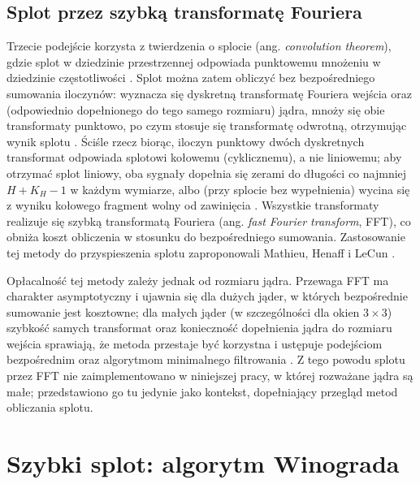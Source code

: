 \documentclass[a4paper,12pt]{book} %
\begin{document}
\subsection{Splot przez szybką transformatę Fouriera}
\label{sec:splot-fft}

Trzecie podejście korzysta z twierdzenia o splocie (ang. \emph{convolution theorem}), gdzie splot w dziedzinie przestrzennej odpowiada punktowemu mnożeniu w dziedzinie częstotliwości \cite{oppenheim2010dtsp}. Splot można zatem obliczyć bez bezpośredniego sumowania iloczynów: wyznacza się dyskretną transformatę Fouriera wejścia oraz (odpowiednio dopełnionego do tego samego rozmiaru) jądra, mnoży się obie transformaty punktowo, po czym stosuje się transformatę odwrotną, otrzymując wynik splotu \cite{oppenheim2010dtsp}. Ściśle rzecz biorąc, iloczyn punktowy dwóch dyskretnych transformat odpowiada splotowi kołowemu (cyklicznemu), a nie liniowemu; aby otrzymać splot liniowy, oba sygnały dopełnia się zerami do długości co najmniej $H + K_H - 1$ w każdym wymiarze, albo (przy splocie bez wypełnienia) wycina się z wyniku kołowego fragment wolny od zawinięcia \cite{oppenheim2010dtsp}. Wszystkie transformaty realizuje się szybką transformatą Fouriera (ang. \emph{fast Fourier transform}, FFT), co obniża koszt obliczenia w stosunku do bezpośredniego sumowania. Zastosowanie tej metody do przyspieszenia splotu zaproponowali Mathieu, Henaff i LeCun \cite{mathieu2014fft}.

Opłacalność tej metody zależy jednak od rozmiaru jądra. Przewaga FFT ma charakter asymptotyczny i ujawnia się dla dużych jąder, w których bezpośrednie sumowanie jest kosztowne; dla małych jąder (w szczególności dla okien $3 \times 3$) szybkość samych transformat oraz konieczność dopełnienia jądra do rozmiaru wejścia sprawiają, że metoda przestaje być korzystna i ustępuje podejściom bezpośrednim oraz algorytmom minimalnego filtrowania \cite{lavin2016fast}. Z tego powodu splotu przez FFT nie zaimplementowano w niniejszej pracy, w której rozważane jądra są małe; przedstawiono go tu jedynie jako kontekst, dopełniający przegląd metod obliczania splotu.

\section{Szybki splot: algorytm Winograda}
\label{sec:splot-winograd}
\end{document}
